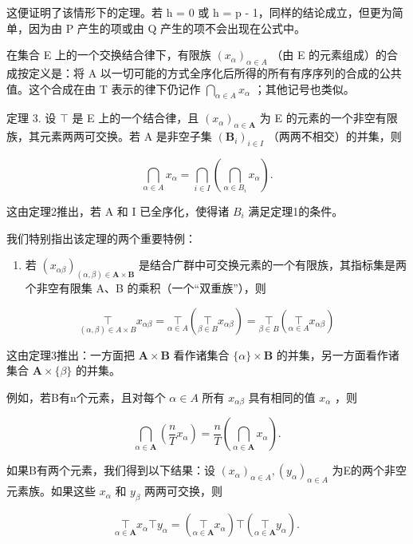 这便证明了该情形下的定理。若 h = 0 或 h = p - 1，同样的结论成立，但更为简单，因为由 P 产生的项或由 Q 产生的项不会出现在公式中。

在集合 E 上的一个交换结合律下，有限族 \((x_{\alpha})_{\alpha \in A}\) （由 E 的元素组成）的合成按定义是：将 A 以一切可能的方式全序化后所得的所有有序序列的合成的公共值。这个合成在由 T 表示的律下仍记作 \(\bigcap_{\alpha \in A} x_{\alpha}\) ；其他记号也类似。

定理 3. 设 \(\top\) 是 E 上的一个结合律，且 \((x_{\alpha})_{\alpha \in \mathbf{A}}\) 为 E 的元素的一个非空有限族，其元素两两可交换。若 A 是非空子集 \((\mathbf{B}_i)_{i\in I}\) （两两不相交）的并集，则

\[
\bigcap_ {\alpha \in A} x _ {\alpha} = \bigcap_ {i \in I} \left(\bigcap_ {\alpha \in B _ {i}} x _ {\alpha}\right).\tag{6}
\]

这由定理2推出，若 A 和 I 已全序化，使得诸 \(B_{i}\) 满足定理1的条件。

我们特别指出该定理的两个重要特例：

\begin{enumerate}
\def\labelenumi{\arabic{enumi}.}
\tightlist
\item
  若 \((x_{\alpha\beta})_{(\alpha,\beta)\in\mathbf{A}\times\mathbf{B}}\) 是结合广群中可交换元素的一个有限族，其指标集是两个非空有限集 A、B 的乘积（一个“双重族”），则
\end{enumerate}

\[
\underset {(\alpha , \beta) \in A \times B} {\top} x _ {\alpha \beta} = \underset {\alpha \in A} {\top} \left(\underset {\beta \in B} {\top} x _ {\alpha \beta}\right) = \underset {\beta \in B} {\top} \left(\underset {\alpha \in A} {\top} x _ {\alpha \beta}\right)\tag{7}
\]

这由定理3推出：一方面把 \(\mathbf{A} \times \mathbf{B}\) 看作诸集合 \(\{\alpha\} \times \mathbf{B}\) 的并集，另一方面看作诸集合 \(\mathbf{A} \times \{\beta\}\) 的并集。

例如，若B有n个元素，且对每个 \(\alpha \in A\) 所有 \(x_{\alpha\beta}\) 具有相同的值 \(x_{\alpha}\) ，则

\[
\bigcap_ {\alpha \in \mathbf {A}} \left(\frac {n}{T} x _ {\alpha}\right) = \frac {n}{T} \left(\bigcap_ {\alpha \in \mathbf {A}} x _ {\alpha}\right).\tag{8}
\]

如果B有两个元素，我们得到以下结果：设 \((x_{\alpha})_{\alpha \in A}, (y_{\alpha})_{\alpha \in A}\) 为E的两个非空元素族。如果这些 \(x_{\alpha}\) 和 \(y_{\beta}\) 两两可交换，则

\[
\underset {\alpha \in \mathbf {A}} {\top} x _ {\alpha} \top y _ {\alpha} = \left(\underset {\alpha \in \mathbf {A}} {\top} x _ {\alpha}\right) \top \left(\underset {\alpha \in \mathbf {A}} {\top} y _ {\alpha}\right).\tag{9}
\]


